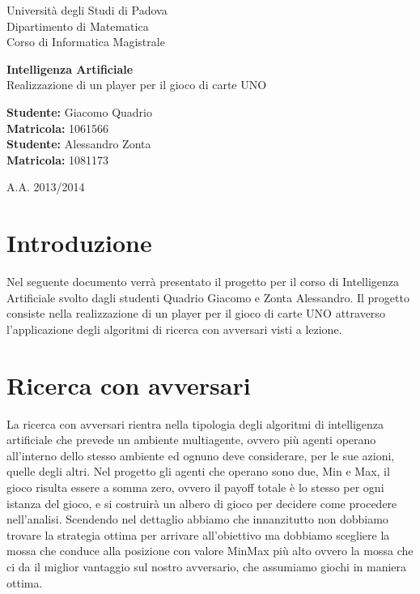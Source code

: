 \begin{titlepage}
\begin{center}
		\vspace{10pt}
		\fontsize{10mm}{12mm}\selectfont Università degli Studi di Padova\\
		\fontsize{8mm}{10mm}\selectfont Dipartimento di Matematica\\
		Corso di Informatica Magistrale
\end{center}
\vspace{30pt}
\begin{center} 
		\fontsize{10mm}{12mm}\selectfont \textbf{Intelligenza Artificiale}\\
		\fontsize{8mm}{10mm}\selectfont Realizzazione di un player per il gioco di carte UNO
\end{center}
\vspace{100pt}
\begin{center}
	\fontsize{5mm}{7mm}\selectfont\textbf{Studente:} Giacomo Quadrio\\
	\fontsize{5mm}{7mm}\selectfont\textbf{Matricola:} 1061566\\
	\vspace{5pt}
	\fontsize{5mm}{7mm}\selectfont\textbf{Studente:} Alessandro Zonta\\
	\fontsize{5mm}{7mm}\selectfont\textbf{Matricola:} 1081173
\end{center}
\vspace{5pt}
\vspace{5pt}
\begin{center}
	\fontsize{5mm}{7mm}\selectfont A.A. 2013/2014
\end{center}
\end{titlepage}

\tableofcontents

\newpage
\section{Introduzione}
	Nel seguente documento verrà presentato il progetto per il corso di Intelligenza Artificiale svolto dagli studenti Quadrio Giacomo e Zonta Alessandro.  Il progetto consiste nella realizzazione di un player per il gioco di carte UNO attraverso l’applicazione degli algoritmi di ricerca con avversari visti a lezione.
\newpage

\section{Ricerca con avversari}
	La ricerca con avversari rientra nella tipologia degli algoritmi di intelligenza artificiale che prevede un ambiente multiagente, ovvero più agenti operano all’interno dello stesso ambiente ed ognuno deve considerare, per le sue azioni, quelle degli altri. Nel progetto gli agenti che operano sono due, Min e Max, il gioco risulta essere a somma zero, ovvero il payoff totale è lo stesso per ogni istanza del gioco, e si costruirà un albero di gioco per decidere come procedere nell’analisi. Scendendo nel dettaglio abbiamo che innanzitutto non dobbiamo trovare la strategia ottima per arrivare all’obiettivo ma dobbiamo scegliere la mossa che conduce alla posizione con valore MinMax più alto ovvero la mossa che ci da il miglior vantaggio sul nostro avversario, che assumiamo giochi in maniera ottima. 
\newpage

